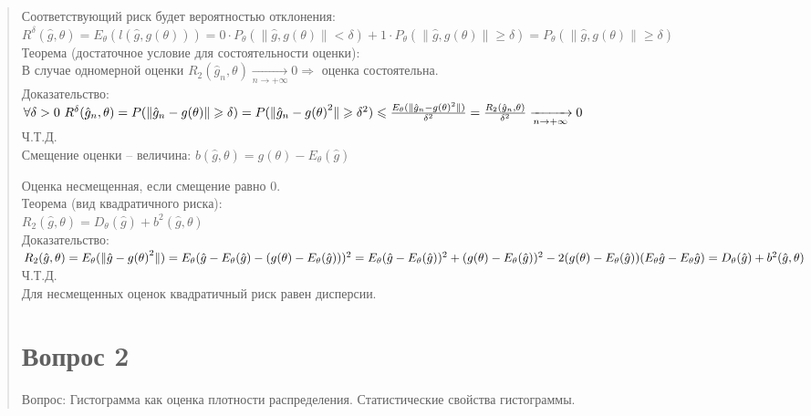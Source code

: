 \documentclass{article}
\begin{document}
\begin{quote}
Соответствующий риск будет вероятностью отклонения:\\
$
R^\delta(\hat{g}, \theta) = E_{\theta}(l(\hat{g}, g(\theta))) =
0 \cdot P_\theta({\lVert}{\hat{g}, g(\theta){\rVert}} < \delta) +
1 \cdot P_\theta({\lVert}{\hat{g}, g(\theta){\rVert}} \geqslant \delta) =
P_\theta({\lVert}{\hat{g}, g(\theta)}{\rVert} \geqslant \delta)
$\\

Теорема (достаточное условие для состоятельности оценки):\\
В случае одномерной оценки $R_2(\hat{g}_n, \theta) 
\xrightarrow[n \to +\infty]{} 0 \Longrightarrow$ оценка состоятельна.\\
Доказательство:\\
$
\forall \delta > 0~ R^\delta(\hat{g}_n, \theta)
= P({\lVert}{\hat{g}_n - g(\theta)}{\rVert} \geqslant \delta) =
P({\lVert}{\hat{g}_n - g(\theta)}^2{\rVert} \geqslant \delta^2)  \\
\leqslant \frac{E_\theta({\lVert}{\hat{g}_n - g(\theta)}^2{\rVert})}{\delta^2} =
\frac{R_2(\hat{g}_n, \theta)}{\delta^2} \xrightarrow[n \to +\infty]{} 0
$
\\ Ч.Т.Д. \\

Смещение оценки -- величина: $b(\hat{g}, \theta) = g(\theta) - E_\theta(\hat{g})$

Оценка несмещенная, если смещение равно $0$.\\

Теорема (вид квадратичного риска):\\
$R_2(\hat{g}, \theta) = D_\theta(\hat{g}) + b^2(\hat{g}, \theta)$ \\
Доказательство: \\
$
R_2(\hat{g}, \theta) = E_\theta({\lVert}{\hat{g} - g(\theta)}^2{\rVert}) \\
= E_\theta(\hat{g} - E_\theta(\hat{g}) - (g(\theta) - E_\theta(\hat{g})))^2 \\
= E_\theta(\hat{g} - E_\theta(\hat{g}))^2 + (g(\theta) -
E_\theta(\hat{g}))^2 - 2(g(\theta) - E_\theta(\hat{g}))(E_\theta{\hat{g}} - E_\theta{\hat{g}}) \\
= D_\theta(\hat{g}) + b^2(\hat{g}, \theta)
$ 
\\ Ч.Т.Д.\\

Для несмещенных оценок квадратичный риск равен дисперсии.
\section{Вопрос 2}
Вопрос: Гистограмма как оценка плотности распределения. Статистические свойства гистограммы. \\


\end{quote}
\end{document}
